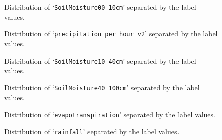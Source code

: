 \documentclass[10pt,parskip=half,
toc=sectionentrywithdots,
bibliography=totocnumbered,
captions=tableheading,numbers=noendperiod]{scrartcl}
\begin{document}
\begin{figure}[H]\begin{center}\end{center}\caption{Distribution of `\texttt{SoilMoisture00\ 10cm}' separated by the label
values.}\label{fig_dist1}\end{figure}

\begin{figure}[H]\begin{center}\end{center}\caption{Distribution of `\texttt{precipitation\ per\ hour\ v2}' separated by the
label values.}\label{fig_dist2}\end{figure}

\begin{figure}[H]\begin{center}\end{center}\caption{Distribution of `\texttt{SoilMoisture10\ 40cm}' separated by the label
values.}\label{fig_dist3}\end{figure}

\begin{figure}[H]\begin{center}\end{center}\caption{Distribution of `\texttt{SoilMoisture40\ 100cm}' separated by the label
values.}\label{fig_dist4}\end{figure}

\begin{figure}[H]\begin{center}\end{center}\caption{Distribution of `\texttt{evapotranspiration}' separated by the label
values.}\label{fig_dist5}\end{figure}

\begin{figure}[H]\begin{center}\end{center}\caption{Distribution of `\texttt{rainfall}' separated by the label values.}\label{fig_dist6}\end{figure}
\end{document}
